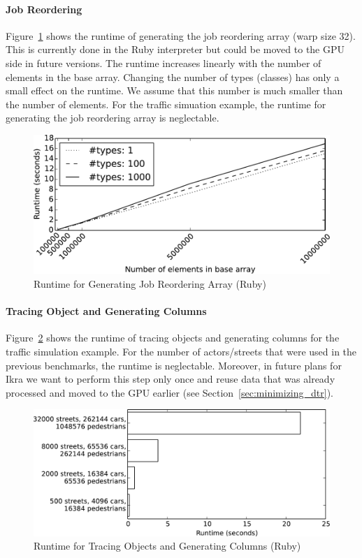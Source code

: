 \documentclass[preprint]{sigplanconf}
\begin{document}
\paragraph{Job Reordering}
Figure~\ref{fig:job_reorder_arr} shows the runtime of generating the job reordering array (warp size 32). This is currently done in the Ruby interpreter but could be moved to the GPU side in future versions. The runtime increases linearly with the number of elements in the base array. Changing the number of types (classes) has only a small effect on the runtime. We assume that this number is much smaller than the number of elements. For the traffic simuation example, the runtime for generating the job reordering array is neglectable.

\begin{figure}[!htp]
    \includegraphics[width=0.9\columnwidth]{plot_reorder.pdf}
    \centering
    \caption{Runtime for Generating Job Reordering Array (Ruby)}
    \label{fig:job_reorder_arr}
\end{figure}

\paragraph{Tracing Object and Generating Columns}
Figure~\ref{fig:tracing} shows the runtime of tracing objects and generating columns for the traffic simulation example. For the number of actors/streets that were used in the previous benchmarks, the runtime is neglectable. Moreover, in future plans for Ikra we want to perform this step only once and reuse data that was already processed and moved to the GPU earlier (see Section~\ref{sec:minimizing_dtr}).

\begin{figure}[!htp]
    \includegraphics[width=\columnwidth]{obj_tracer.pdf}
    \centering
    \caption{Runtime for Tracing Objects and Generating Columns (Ruby)}
    \label{fig:tracing}
\end{figure}
\end{document}
